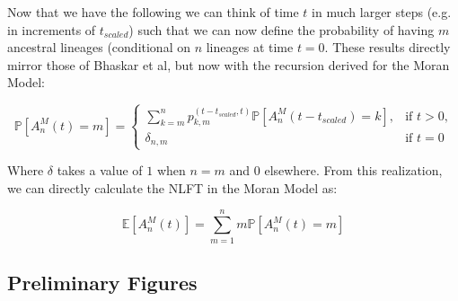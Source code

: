 \documentclass[10pt]{article}
\begin{document}
Now that we have the following we can think of time $t$ in much larger steps (e.g. in increments of $t_{scaled}$) such that we can now define the probability of having $m$ ancestral lineages (conditional on $n$ lineages at time $t = 0$. These results directly mirror those of Bhaskar et al, but now with the recursion derived for the Moran Model:

 \begin{equation*}
	 \mathbb{P}[A^M_n(t) = m] =
	 \begin{cases} 
		 \sum^n_{k=m}  p^{(t-t_{scaled}, t)}_{k,m} \mathbb{P}[A^M_n (t-t_{scaled}) = k],  &\text{if $t > 0$,}
	 	 \\
		 \delta_{n,m} &\text{if $t = 0$}
	 \end{cases}
 \end{equation*}

 Where $\delta$ takes a value of $1$ when $n=m$ and $0$ elsewhere. From this realization, we can directly calculate the NLFT in the Moran Model as:

 \begin{equation*}
	 \mathbb{E}[A^M_n(t)] = \sum^n_{m=1} m \mathbb{P}[A^M_n (t) = m]
 \end{equation*}






\newpage

\subsection{Preliminary Figures}
\end{document}

